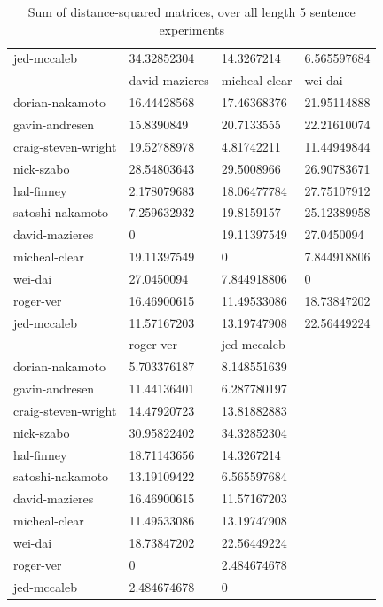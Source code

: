 \documentclass{article}%
\begin{document}
\begin{table}[]
\begin{tabular}{llll}
jed-mccaleb         & 34.32852304     & 14.3267214     & 6.565597684         \\
                    & david-mazieres  & micheal-clear  & wei-dai             \\
dorian-nakamoto     & 16.44428568     & 17.46368376    & 21.95114888         \\
gavin-andresen      & 15.8390849      & 20.7133555     & 22.21610074         \\
craig-steven-wright & 19.52788978     & 4.81742211     & 11.44949844         \\
nick-szabo          & 28.54803643     & 29.5008966     & 26.90783671         \\
hal-finney          & 2.178079683     & 18.06477784    & 27.75107912         \\
satoshi-nakamoto    & 7.259632932     & 19.8159157     & 25.12389958         \\
david-mazieres      & 0               & 19.11397549    & 27.0450094          \\
micheal-clear       & 19.11397549     & 0              & 7.844918806         \\
wei-dai             & 27.0450094      & 7.844918806    & 0                   \\
roger-ver           & 16.46900615     & 11.49533086    & 18.73847202         \\
jed-mccaleb         & 11.57167203     & 13.19747908    & 22.56449224         \\
                    & roger-ver       & jed-mccaleb    &                     \\
dorian-nakamoto     & 5.703376187     & 8.148551639    &                     \\
gavin-andresen      & 11.44136401     & 6.287780197    &                     \\
craig-steven-wright & 14.47920723     & 13.81882883    &                     \\
nick-szabo          & 30.95822402     & 34.32852304    &                     \\
hal-finney          & 18.71143656     & 14.3267214     &                     \\
satoshi-nakamoto    & 13.19109422     & 6.565597684    &                     \\
david-mazieres      & 16.46900615     & 11.57167203    &                     \\
micheal-clear       & 11.49533086     & 13.19747908    &                     \\
wei-dai             & 18.73847202     & 22.56449224    &                     \\
roger-ver           & 0               & 2.484674678    &                     \\
jed-mccaleb         & 2.484674678     & 0              &                    
\end{tabular}

\caption{Sum of distance-squared matrices, over all length 5 sentence experiments}
\end{table}
\end{document}

